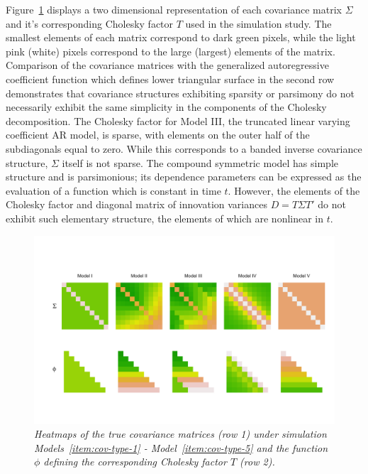 \bigskip

Figure~\ref{fig:true-covariance-heatmaps} displays a two dimensional representation of each covariance matrix $\Sigma$ and it's corresponding Cholesky factor $T$ used in the simulation study. The smallest elements of each matrix correspond to dark green pixels, while the light pink (white) pixels correspond to the large (largest) elements of the matrix. Comparison of the covariance matrices with the generalized autoregressive coefficient function which defines lower triangular surface in the second row demonstrates that covariance structures exhibiting sparsity or parsimony do not necessarily exhibit the same simplicity in the components of the Cholesky decomposition. The Cholesky factor for Model III, the truncated linear varying coefficient AR model, is sparse, with elements on the outer half of the subdiagonals equal to zero. While this corresponds to a banded inverse covariance structure, $\Sigma$ itself is not sparse.  The compound symmetric model has simple structure and is parsimonious; its dependence parameters can be expressed as the evaluation of a function which is constant in time $t$. However, the elements of the Cholesky factor and diagonal matrix of innovation variances $D = T \Sigma T'$ do not exhibit such elementary structure, the elements of which are nonlinear in $t$. 

%
\begin{figure}[H] 
\begin{center}
  \includegraphics[width = \textwidth]{img/chapter-4/cov-cholesky-grid}%
\caption{\textit{Heatmaps of the true covariance matrices (row 1) under simulation Models~\ref{item:cov-type-1} - Model~\ref{item:cov-type-5} and the function $\phi$ defining the corresponding Cholesky factor $T$ (row 2).} } \label{fig:true-covariance-heatmaps}
\end{center}
\end{figure}


